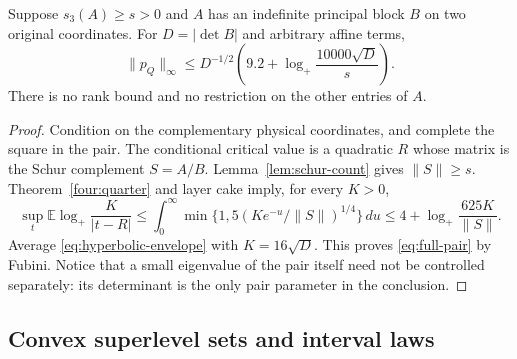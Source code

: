 \begin{theorem}\label{geom:fullpair}
Suppose $s_3(A)\ge s>0$ and $A$ has an indefinite principal block $B$ on two original coordinates. For $D=|\det B|$ and arbitrary affine terms,
\begin{equation}\label{eq:full-pair}
 \|p_Q\|_\infty\le D^{-1/2}
 \left(9.2+\log_+\frac{10000\sqrt D}{s}\right).
\end{equation}
There is no rank bound and no restriction on the other entries of $A$.
\end{theorem}
\begin{proof}
Condition on the complementary physical coordinates, and complete the square in the pair. The conditional critical value is a quadratic $R$ whose matrix is the Schur complement $S=A/B$. Lemma~\ref{lem:schur-count} gives $\|S\|\ge s$. Theorem~\ref{four:quarter} and layer cake imply, for every $K>0$,
\[
 \sup_t\mathbb E\log_+\frac K{|t-R|}
 \le\int_0^\infty\min\{1,5(K e^{-u}/\|S\|)^{1/4}\}\,du
 \le4+\log_+\frac{625K}{\|S\|}.
\]
Average \eqref{eq:hyperbolic-envelope} with $K=16\sqrt D$. This proves \eqref{eq:full-pair} by Fubini. Notice that a small eigenvalue of the pair itself need not be controlled separately: its determinant is the only pair parameter in the conclusion.
\end{proof}

\subsection{Convex superlevel sets and interval laws}

